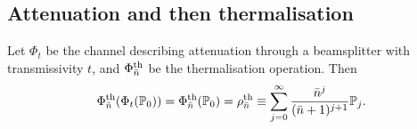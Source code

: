 \documentclass[12pt]{report}
\newcommand{\PP}{\mathbb{P}}
\begin{document}

\subsection{Attenuation and then thermalisation}

\begin{prop}
	Let $\Phi_t$ be the channel describing attenuation through a beamsplitter with transmissivity $t$, and $\Phi_{\bar n}^{\rm th}$ be the thermalisation operation. Then
	\begin{equation}
	\Phi^{\rm th}_{\bar n}(\Phi_t(\PP_0))
	= \Phi^{\rm th}_{\bar n}(\PP_0)
	= \rho^{\rm th}_{\bar n}
	\equiv \sum_{j=0}^\infty \frac{\bar n^j}{(\bar n + 1)^{j+1}} \PP_j.
	\end{equation}
\end{prop}
\end{document}

